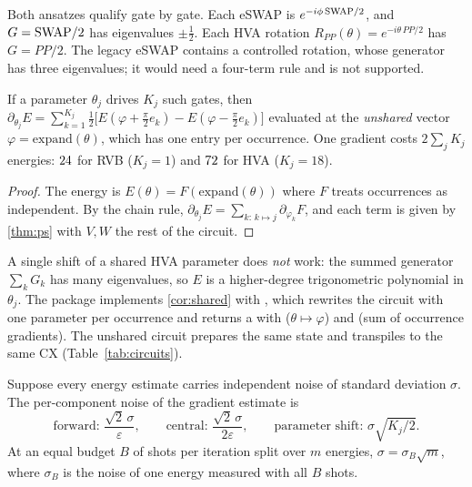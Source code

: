 Both ansatzes qualify gate by gate. Each eSWAP is $e^{-i\phi\,\mathrm{SWAP}/2}$, and $G=\mathrm{SWAP}/2$ has
eigenvalues $\pm\frac12$. Each HVA rotation $R_{PP}(\theta)=e^{-i\theta\,PP/2}$ has $G=PP/2$.
The legacy eSWAP contains a controlled rotation, whose generator has three eigenvalues; it
would need a four-term rule and is not supported.

\begin{cor}\label{cor:shared}
  If a parameter $\theta_j$ drives $K_j$ such gates, then
  $\partial_{\theta_j}E=\sum_{k=1}^{K_j}\tfrac12\bigl[E(\varphi+\tfrac\pi2e_k)-E(\varphi-\tfrac\pi2e_k)\bigr]$
  evaluated at the \emph{unshared} vector $\varphi=\mathrm{expand}(\theta)$, which has one entry
  per occurrence. One gradient costs $2\sum_jK_j$ energies: $24$ for RVB ($K_j=1$)
  and $72$ for HVA ($K_j=18$).
\end{cor}

\begin{proof}
  The energy is $E(\theta)=F(\mathrm{expand}(\theta))$ where $F$ treats occurrences as
  independent. By the chain rule, $\partial_{\theta_j}E=\sum_{k:\,k\mapsto j}\partial_{\varphi_k}F$,
  and each term is given by \cref{thm:ps} with $V,W$ the rest of the circuit.
\end{proof}

A single shift of a shared HVA parameter does \emph{not} work: the summed generator
$\sum_kG_k$ has many eigenvalues, so $E$ is a higher-degree trigonometric polynomial in
$\theta_j$. The package implements \cref{cor:shared} with , which rewrites
the circuit with one parameter per occurrence and returns a  with
 ($\theta\mapsto\varphi$) and  (sum of occurrence gradients). The
unshared circuit prepares the same state and transpiles to the same \VCxHvaUnshared{} CX
(Table~\ref{tab:circuits}).

\begin{prop}\label{prop:gradnoise}
  Suppose every energy estimate carries independent noise of standard deviation $\sigma$. The
  per-component noise of the gradient estimate is
  \[
    \text{forward: }\frac{\sqrt2\,\sigma}{\varepsilon},\qquad
    \text{central: }\frac{\sqrt2\,\sigma}{2\varepsilon},\qquad
    \text{parameter shift: }\sigma\sqrt{K_j/2}.
  \]
  At an equal budget $B$ of shots per iteration split over $m$ energies, $\sigma=\sigma_B\sqrt m$,
  where $\sigma_B$ is the noise of one energy measured with all $B$ shots.
\end{prop}

